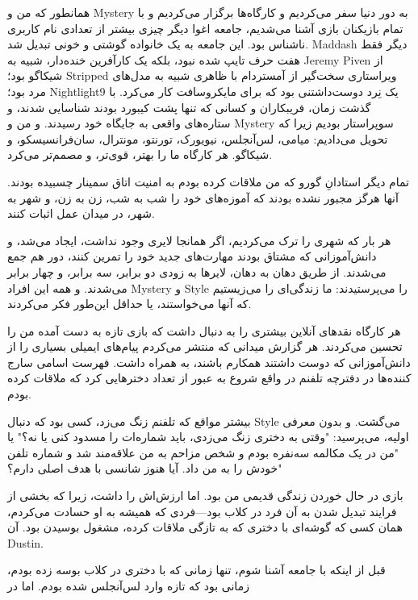 همانطور که من و Mystery به دور دنیا سفر می‌کردیم و کارگاه‌ها برگزار می‌کردیم و با تمام بازیکنان بازی آشنا می‌شدیم، جامعه اغوا دیگر چیزی بیشتر از تعدادی نام کاربری ناشناس بود. این جامعه به یک خانواده گوشتی و خونی تبدیل شد. Maddash دیگر فقط هفت حرف تایپ شده نبود، بلکه یک کارآفرین خنده‌دار، شبیه به Jeremy Piven از شیکاگو بود؛ Stripped ویراستاری سخت‌گیر از آمستردام با ظاهری شبیه به مدل‌های مرد بود؛ Nightlight9 یک نِرد دوست‌داشتنی بود که برای مایکروسافت کار می‌کرد. با گذشت زمان، فریبکاران و کسانی که تنها پشت کیبورد بودند شناسایی شدند، و ستاره‌های واقعی به جایگاه خود رسیدند. و من و Mystery سوپراستار بودیم زیرا که تحویل می‌دادیم: میامی، لس‌آنجلس، نیویورک، تورنتو، مونترال، سان‌فرانسیسکو، و شیکاگو. هر کارگاه ما را بهتر، قوی‌تر، و مصمم‌تر می‌کرد.

تمام دیگر استادانِ گورو که من ملاقات کرده بودم به امنیت اتاق سمینار چسبیده بودند. آنها هرگز مجبور نشده بودند که آموزه‌های خود را شب به شب، زن به زن، و شهر به شهر، در میدان عمل اثبات کنند.

هر بار که شهری را ترک می‌کردیم، اگر همانجا لایری وجود نداشت، ایجاد می‌شد، و دانش‌آموزانی که مشتاق بودند مهارت‌های جدید خود را تمرین کنند، دور هم جمع می‌شدند. از طریق دهان به دهان، لایرها به زودی دو برابر، سه برابر، و چهار برابر می‌شدند. و همه این افراد Mystery و Style را می‌پرستیدند: ما زندگی‌ای را می‌زیستیم که آنها می‌خواستند، یا حداقل این‌طور فکر می‌کردند.

هر کارگاه نقدهای آنلاین بیشتری را به دنبال داشت که بازی تازه به دست آمده من را تحسین می‌کردند. هر گزارش میدانی که منتشر می‌کردم پیام‌های ایمیلی بسیاری را از دانش‌آموزانی که دوست داشتند همکارم باشند، به همراه داشت. فهرست اسامی سارج کننده‌ها در دفترچه تلفنم در واقع شروع به عبور از تعداد دخترهایی کرد که ملاقات کرده بودم.

بیشتر مواقع که تلفنم زنگ می‌زد، کسی بود که دنبال Style می‌گشت. و بدون معرفی اولیه، می‌پرسید: "وقتی به دختری زنگ می‌زدی، باید شماره‌ات را مسدود کنی یا نه؟" یا "من در یک مکالمه سه‌نفره بودم و شخص مزاحم به من علاقه‌مند شد و شماره تلفن خودش را به من داد. آیا هنوز شانسی با هدف اصلی دارم؟"

بازی در حال خوردن زندگی قدیمی من بود. اما ارزش‌اش را داشت، زیرا که بخشی از فرایند تبدیل شدن به آن فرد در کلاب بود—فردی که همیشه به او حسادت می‌کردم، همان کسی که گوشه‌ای با دختری که به تازگی ملاقات کرده، مشغول بوسیدن بود. آن Dustin.

قبل از اینکه با جامعه آشنا شوم، تنها زمانی که با دختری در کلاب بوسه زده بودم، زمانی بود که تازه وارد لس‌آنجلس شده بودم. اما در